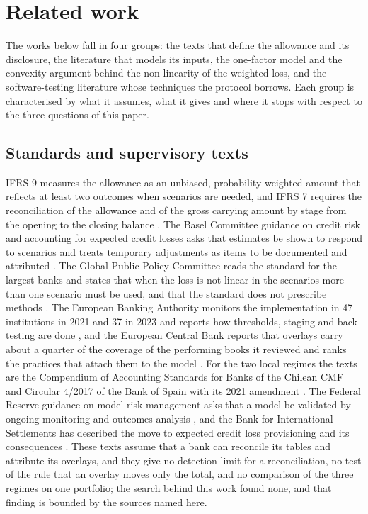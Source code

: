 \section{Related work}
\label{sec:related-work}

The works below fall in four groups: the texts that define the allowance and its disclosure, the literature that models its inputs, the one-factor model and the convexity argument behind the non-linearity of the weighted loss, and the software-testing literature whose techniques the protocol borrows.
Each group is characterised by what it assumes, what it gives and where it stops with respect to the three questions of this paper.

\subsection{Standards and supervisory texts}
\label{sec:rw-standards}

IFRS 9 measures the allowance as an unbiased, probability-weighted amount that reflects at least two outcomes when scenarios are needed, and IFRS 7 requires the reconciliation of the allowance and of the gross carrying amount by stage from the opening to the closing balance \citep{ifrs9eu}.
The Basel Committee guidance on credit risk and accounting for expected credit losses asks that estimates be shown to respond to scenarios and treats temporary adjustments as items to be documented and attributed \citep{bcbsd350}.
The Global Public Policy Committee reads the standard for the largest banks and states that when the loss is not linear in the scenarios more than one scenario must be used, and that the standard does not prescribe methods \citep{gppc2016}.
The European Banking Authority monitors the implementation in 47 institutions in 2021 and 37 in 2023 and reports how thresholds, staging and back-testing are done \citep{eba2021,eba2023}, and the European Central Bank reports that overlays carry about a quarter of the coverage of the performing books it reviewed and ranks the practices that attach them to the model \citep{ecb2024}.
For the two local regimes the texts are the Compendium of Accounting Standards for Banks of the Chilean CMF \citep{cmfcncb} and Circular 4/2017 of the Bank of Spain with its 2021 amendment \citep{boe2017,boe2021}.
The Federal Reserve guidance on model risk management asks that a model be validated by ongoing monitoring and outcomes analysis \citep{sr117}, and the Bank for International Settlements has described the move to expected credit loss provisioning and its consequences \citep{cohenedwards2017}.
These texts assume that a bank can reconcile its tables and attribute its overlays, and they give no detection limit for a reconciliation, no test of the rule that an overlay moves only the total, and no comparison of the three regimes on one portfolio; the search behind this work found none, and that finding is bounded by the sources named here.

